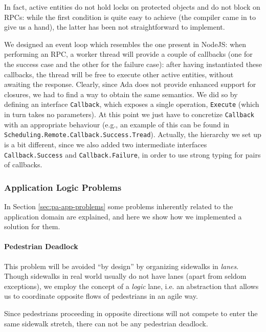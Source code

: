 In fact, active entities do not hold locks on protected objects and do not
block on RPCs: while the first condition is quite easy to achieve (the
compiler came in to give us a hand), the latter has been not straightforward
to implement.

We designed an event loop which resembles the one present in NodeJS: when
performing an RPC, a worker thread will provide a couple of callbacks (one for
the success case and the other for the failure case): after having instantiated
these callbacks, the thread will be free to execute other active entities,
without awaiting the response.
Clearly, since Ada does not provide enhanced support for closures, we had to
find a way to obtain the same semantics. We did so by defining an interface
\texttt{Callback}, which exposes a single operation, \texttt{Execute} (which
in turn takes no parameters). At this point we just have to concretize
\texttt{Callback} with an appropriate behaviour (e.g., an example of this can
be found in \texttt{Scheduling.Remote.Callback.Success.Tread}).
Actually, the hierarchy we set up is a bit different, since we also added two
intermediate interfaces \texttt{Callback.Success} and
\texttt{Callback.Failure}, in order to use strong typing for pairs of
callbacks.


\subsubsection{Application Logic Problems}

In Section \ref{sec:pa-app-problems} some problems inherently related to the
application domain are explained, and here we show how we implemented a
solution for them.

\paragraph{Pedestrian Deadlock}
This problem will be avoided ``by design'' by organizing sidewalks in
\textit{lanes}. Though sidewalks in real world usually do not have lanes (apart
from seldom exceptions), we employ the concept of a \textit{logic} lane, i.e.
an abstraction that allows us to coordinate opposite flows of pedestrians in an
agile way.

Since pedestrians proceeding in opposite directions will not compete to enter
the same sidewalk stretch, there can not be any pedestrian deadlock.

